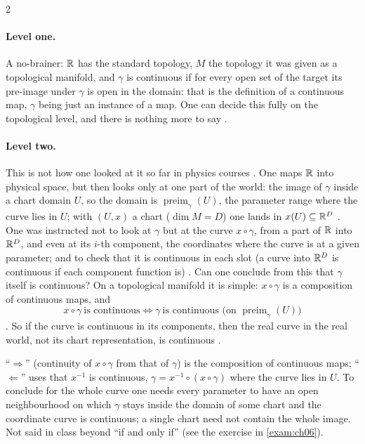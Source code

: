\begin{paracol}{2}
\paragraph{Level one.} A no-brainer: $\mathbb{R}$ has the standard topology, $M$ the topology it was given as a topological manifold, and $\gamma$ is continuous if for every open set of the target its pre-image under $\gamma$ is open in the domain: that is the definition of a continuous map,
$\gamma$ being just an instance of a map. One can decide this fully on the topological level, and there is nothing more to say .

\paragraph{Level two.} This is not how one looked at it so far in physics courses . One maps $\mathbb{R}$ into physical space, but then looks only at one part of the world: the image of $\gamma$ inside a chart domain $U$, so the domain is
$\operatorname{preim}_\gamma(U)$, the parameter range where the curve lies in $U$; with $(U,x)$ a chart ($\dim M=D$) one lands in $x(U)\subseteq\mathbb{R}^D$ . One was instructed not to look at $\gamma$
but at the curve $x\circ\gamma$, from a part of $\mathbb{R}$ into $\mathbb{R}^D$, and even at its $i$-th component, the coordinates where the curve is at a given parameter; and to check that it is continuous in each slot (a curve into $\mathbb{R}^D$ is continuous if each component function is)
.
Can one conclude from this that $\gamma$ itself is continuous? On a topological manifold it is simple: $x\circ\gamma$ is a composition of continuous maps, and
\[
  x\circ\gamma\ \text{is continuous}\iff\gamma\ \text{is continuous (on }\operatorname{preim}_\gamma(U)\text{)}
\]
. So if the curve is continuous in its components, then the real curve in the real world, not its chart representation, is continuous .
\begin{coursenote}
``$\Rightarrow$'' (continuity of $x\circ\gamma$ from that of $\gamma$) is the composition of continuous maps; ``$\Leftarrow$'' uses that $x^{-1}$ is continuous, $\gamma=x^{-1}\circ(x\circ\gamma)$ where the curve lies in $U$. To conclude for the whole curve one needs
every parameter to have an open neighbourhood on which $\gamma$ stays inside the domain of some chart and the coordinate curve is continuous; a single chart need not contain the whole image. Not said in class beyond ``if and only if''
(see the exercise in \cref{exam:ch06}).
\end{coursenote}


\end{paracol}
